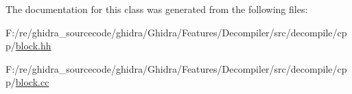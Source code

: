 The documentation for this class was generated from the following files\+:\begin{DoxyCompactItemize}
\item 
F\+:/re/ghidra\+\_\+sourcecode/ghidra/\+Ghidra/\+Features/\+Decompiler/src/decompile/cpp/\mbox{\hyperlink{block_8hh}{block.\+hh}}\item 
F\+:/re/ghidra\+\_\+sourcecode/ghidra/\+Ghidra/\+Features/\+Decompiler/src/decompile/cpp/\mbox{\hyperlink{block_8cc}{block.\+cc}}\end{DoxyCompactItemize}

